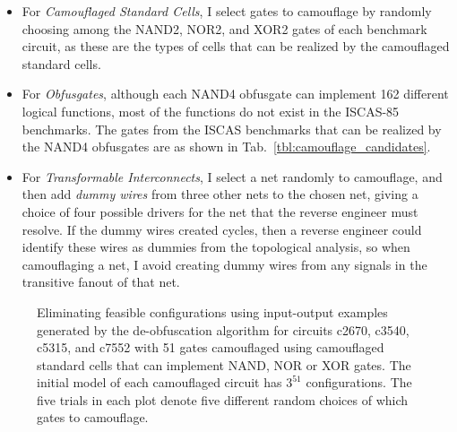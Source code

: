\documentclass[proposal]{umassthesis}  %
\begin{document}
\begin{itemize}

\item For \textit{Camouflaged Standard Cells}, I select {gates to camouflage by randomly choosing among the } NAND2, NOR2, and XOR2 gates of each benchmark circuit, as these are the types of cells that can be realized by the camouflaged standard cells.

\item For \textit{Obfusgates}, although each NAND4 obfusgate can implement 162 different logical functions, most of the functions do not exist in the ISCAS-85 benchmarks. The gates from the ISCAS benchmarks that can be realized by the NAND4 obfusgates are as shown in Tab.~\ref{tbl:camouflage_candidates}.

\item For \textit{Transformable Interconnects}, I select a net randomly to camouflage, and then add \textit{dummy wires} from three other nets to the chosen net, giving a choice of four possible drivers for the net that the reverse engineer must resolve. If the dummy wires created cycles, then a reverse engineer could identify these wires as dummies from the topological analysis, so when camouflaging a net, I avoid creating dummy wires from any signals in the transitive fanout of that net. 

\end{itemize}


\begin{figure}[!hbt]
  \centering
  {
        \vspace{-2mm}
    
    }
    \vspace{-2mm}
    
    \caption{Eliminating feasible configurations using input-output examples generated by the de-obfuscation algorithm for circuits c2670, c3540, c5315, and c7552 with 51 gates camouflaged using camouflaged standard cells that can implement NAND, NOR or XOR gates. The initial model of each camouflaged circuit has $3^{51}$ configurations. The five trials in each plot denote five different random choices of which gates to camouflage.}
    \vspace{-2mm}
    \label{fig:c7552_coverage}
\end{figure}
\end{document}
